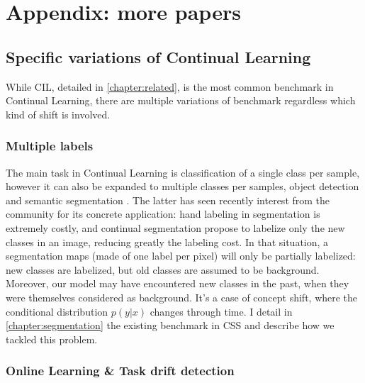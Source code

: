 \chapter{Appendix: more papers}
\label{chapter:appendix}

{}


\section{Specific variations of Continual Learning}
\label{sec:related_variation}

While \acf{CIL}, detailed in \autoref{chapter:related}, is the most common benchmark in Continual
Learning, there are multiple variations of benchmark regardless which kind of shift is involved.

\subsection{Multiple labels}
\label{sec:related_multiple_labels}

The main task in Continual Learning is classification of a single class per sample, however it can
also be expanded to multiple classes per samples, \eg object detection
\citep{shmelkov2017incrementalobjectdetection} and semantic segmentation
\citep{michieli2019ilt,cermelli2020modelingthebackground}. The latter has seen recently interest
from the community for its concrete application: hand labeling in segmentation is extremely costly,
and continual segmentation propose to labelize only the new classes in an image, reducing greatly
the labeling cost. In that situation, a segmentation maps (made of one label per pixel) will only be
partially labelized: new classes are labelized, but old classes are assumed to be background.
Moreover, our model may have encountered new classes in the past, when they were themselves
considered as background. It's a case of concept shift, where the conditional distribution $p(y |
      x)$ changes through time. I detail in \autoref{chapter:segmentation} the existing benchmark in
\ac{CSS} and describe how we tackled this problem.

\subsection{Online Learning \& Task drift detection}
\label{sec:related_online_learning}

